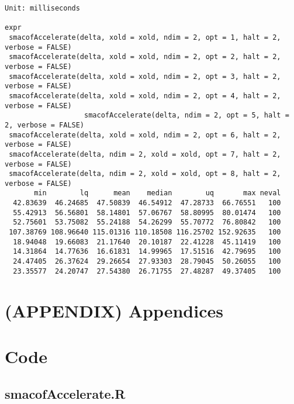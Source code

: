 \documentclass[
  12pt,
  letterpaper,
  DIV=11,
  numbers=noendperiod]{scrartcl}
\begin{document}
\begin{verbatim}
Unit: milliseconds
                                                                                    expr
 smacofAccelerate(delta, xold = xold, ndim = 2, opt = 1, halt = 2,      verbose = FALSE)
 smacofAccelerate(delta, xold = xold, ndim = 2, opt = 2, halt = 2,      verbose = FALSE)
 smacofAccelerate(delta, xold = xold, ndim = 2, opt = 3, halt = 2,      verbose = FALSE)
 smacofAccelerate(delta, xold = xold, ndim = 2, opt = 4, halt = 2,      verbose = FALSE)
                   smacofAccelerate(delta, ndim = 2, opt = 5, halt = 2, verbose = FALSE)
 smacofAccelerate(delta, xold = xold, ndim = 2, opt = 6, halt = 2,      verbose = FALSE)
 smacofAccelerate(delta, ndim = 2, xold = xold, opt = 7, halt = 2,      verbose = FALSE)
 smacofAccelerate(delta, ndim = 2, xold = xold, opt = 8, halt = 2,      verbose = FALSE)
       min        lq      mean    median        uq       max neval
  42.83639  46.24685  47.50839  46.54912  47.28733  66.76551   100
  55.42913  56.56801  58.14801  57.06767  58.80995  80.01474   100
  52.75601  53.75082  55.24188  54.26299  55.70772  76.80842   100
 107.38769 108.96640 115.01316 110.18508 116.25702 152.92635   100
  18.94048  19.66083  21.17640  20.10187  22.41228  45.11419   100
  14.31864  14.77636  16.61831  14.99965  17.51516  42.79695   100
  24.47405  26.37624  29.26654  27.93303  28.79045  50.26055   100
  23.35577  24.20747  27.54380  26.71755  27.48287  49.37405   100
\end{verbatim}

\section*{(APPENDIX) Appendices}\label{appendix-appendices}

\section{Code}\label{code}

\subsection{smacofAccelerate.R}\label{smacofaccelerate.r}
\end{document}
